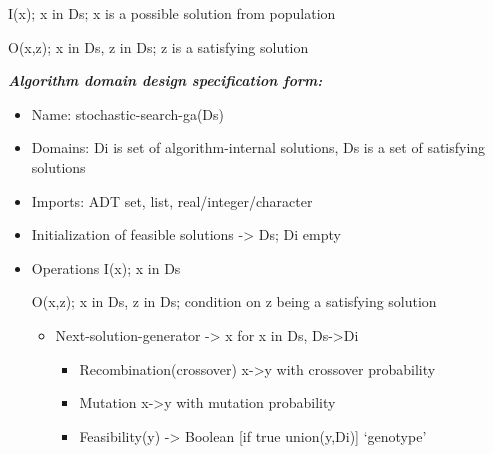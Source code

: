 \documentclass[12pt]{article}
\renewcommand{\_}{\kern-1.5pt\textunderscore\kern-1.5pt}
\begin{document}
\begin{adjustwidth}{1.5in}{0.0in}
I(x); x in Ds; x is a possible solution from population\par

\end{adjustwidth}

\begin{adjustwidth}{1.5in}{0.0in}
O(x,z); x in Ds, z in Ds; z is a satisfying solution\par

\end{adjustwidth}

\textbf{\textit{Algorithm domain design specification form:}}\par

\begin{itemize}
	\item Name: stochastic-search-ga(Ds)\par

	\item Domains: Di is set of algorithm-internal solutions, Ds is a set of satisfying solutions\par

	\item Imports: ADT set, list, real/integer/character\par

	\item Initialization of feasible solutions -> Ds; Di empty\par

	\item Operations I(x); x in Ds\par

O(x,z); x in Ds, z in Ds; condition on z being a satisfying solution\par

\begin{itemize}
	\item Next-solution-generator -> x for x in Ds, Ds->Di\par

\begin{itemize}
	\item Recombination(crossover) x->y with crossover probability\par

	\item Mutation x->y with mutation probability\par

	\item Feasibility(y) -> Boolean [if true union(y,Di)] ‘genotype’\par



\end{itemize}
\end{itemize}
\end{itemize}
\end{document}
